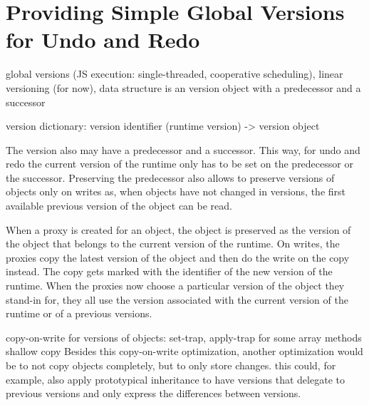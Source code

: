 

\section{Providing Simple Global Versions for Undo and Redo} \label{sec:IMPLEMENTATION:3}


global versions (JS execution: single-threaded, cooperative scheduling), linear versioning (for now), data structure is an version object with a predecessor and a successor

version dictionary: version identifier (runtime version) -> version object

The version also may have a predecessor and a successor.
This way, for undo and redo the current version of the runtime only has to be set on the predecessor or the successor.
Preserving the predecessor also allows to preserve versions of objects only on writes as, when objects have not changed in versions, the first available previous version of the object can be read.



When a proxy is created for an object, the object is preserved as the version of the object that belongs to the current version of the runtime.
On writes, the proxies copy the latest version of the object and then do the write on the copy instead.
The copy gets marked with the identifier of the new version of the runtime.
When the proxies now choose a particular version of the object they stand-in for, they all use the version associated with the current version of the runtime or of a previous versions.

copy-on-write for versions of objects: set-trap, apply-trap for some array methods
shallow copy
Besides this copy-on-write optimization, another optimization would be to not copy objects completely, but to only store changes.
this could, for example, also apply prototypical inheritance to have versions that delegate to previous versions and only express the differences between versions.



